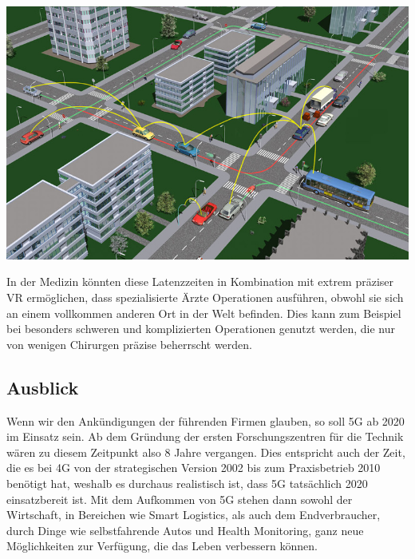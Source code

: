 \begin{multicols}{3}
\begin{Figure}
\includegraphics[width=\linewidth]{Kapitel/5G/Grafiken/c2c}
\label{fig:5g.c2c}
\end{Figure}

In der Medizin könnten diese Latenzzeiten in Kombination mit extrem präziser VR ermöglichen, dass spezialisierte Ärzte Operationen ausführen, obwohl sie sich an einem vollkommen anderen Ort in der Welt befinden. Dies kann zum Beispiel bei besonders schweren und komplizierten Operationen genutzt werden, die nur von wenigen Chirurgen präzise beherrscht werden.\cite{5g.10}
\subsection*{Ausblick}
Wenn wir den Ankündigungen der führenden Firmen glauben, so soll 5G ab 2020 im Einsatz sein. Ab dem Gründung der ersten Forschungszentren für die Technik wären zu diesem Zeitpunkt also 8 Jahre vergangen.
Dies entspricht auch der Zeit, die es bei 4G von der strategischen Version 2002 bis zum Praxisbetrieb 2010 benötigt hat, weshalb es durchaus realistisch ist, dass 5G tatsächlich 2020 einsatzbereit ist. 
Mit dem Aufkommen von 5G stehen dann sowohl der Wirtschaft, in Bereichen wie Smart Logistics, als auch dem Endverbraucher, durch Dinge wie selbstfahrende Autos und Health Monitoring, ganz neue Möglichkeiten zur Verfügung, die das Leben verbessern können.

\printbibliography[segment=9,heading=subbibliography]
\end{multicols}

\newpage